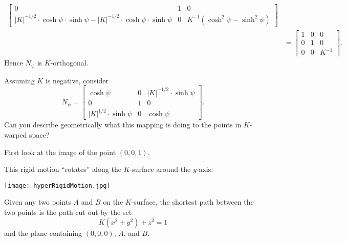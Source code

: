 \documentclass[handout,newpage,hints,,12pt,noauthor,nooutcomes]{ximera}
\begin{document}
\begin{problem}
\begin{freeResponse}
\begin{align*}
\begin{bmatrix}
    0 & 1 & 0\\
    |K|^{-1/2}\cdot\cosh\psi\cdot\sinh\psi- |K|^{-1/2}\cdot\cosh\psi\cdot\sinh\psi & 0 &  K^{-1}(\cosh^2\psi -\sinh^2\psi )
 \end{bmatrix}\\
 &=\begin{bmatrix}
        1 & 0 & 0 \\
        0 & 1 & 0 \\
        0 & 0 & K^{-1}
      \end{bmatrix}.
    \end{align*}
    Hence $N_\psi$ is $K$-orthogonal.
  \end{freeResponse}
\end{problem}







\begin{problem}
  Assuming $K$ is negative, consider
  \[
  N_\psi=
  \begin{bmatrix}
    \cosh\psi & 0 & |K|^{-1/2}\cdot\sinh\psi\\
    0 & 1 & 0\\
    |K|^{1/2}\cdot\sinh\psi & 0 & \cosh\psi
  \end{bmatrix}.
  \]
  Can you describe geometrically what this mapping is doing to the
  points in $K$-warped space?
  \begin{hint}
    First look at the image of the point $(0,0,1)$.
  \end{hint}
  \begin{freeResponse}
    This rigid motion ``rotates'' along the $K$-surface around the $y$-axis:
    \begin{image}
      \texttt{[image: hyperRigidMotion.jpg]}
    \end{image}
  \end{freeResponse}
\end{problem}


\begin{theorem}
Given any two points $A$ and $B$ on the $K$-surface, the shortest path
between the two points is the path cut out by the set
\[
K\left(  x^{2}+y^{2}\right)  +z^{2}=1
\]
and the plane containing $(0,0,0)$, $A$, and $B$.
\end{theorem}
\end{document}
